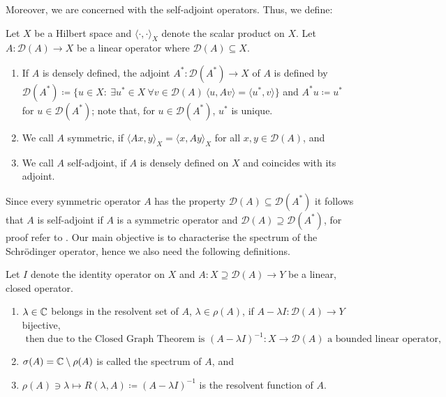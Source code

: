 Moreover, we are concerned with the self-adjoint operators. Thus, we define:

\begin{definition}
Let $X$ be a Hilbert space and $\langle \cdot, \cdot \rangle_{X}$ denote the scalar product on $X$. Let $A \colon \mathcal{D}(A) \rightarrow X$ be a linear operator where $\mathcal{D}(A) \subseteq X$.
	\begin{enumerate}[label=\alph*\upshape)]
		\item If $A$ is densely defined, the adjoint $A^{*} \colon \mathcal{D}(A^{*}) \rightarrow X$ of $A$ is defined by $\mathcal{D}(A^{*}) \coloneqq \{ u \in X \colon ~\exists u^{*} \in X ~\forall v \in \mathcal{D}(A) ~\langle u, Av \rangle = \langle u^{*} , v \rangle \}$ and $A^{*} u \coloneqq u^{*}$ for $u \in \mathcal{D}(A^{*})$; note that, for $u \in \mathcal{D}(A^{*})$, $u^{*}$ is unique.
		\item We call $A$ symmetric, if $\langle Ax,y \rangle_{X} = \langle x , Ay \rangle_{X}$ for all $x,y \in \mathcal{D}(A)$, and
		\item We call $A$ self-adjoint, if $A$ is densely defined on $X$ and coincides with its adjoint.
	\end{enumerate}
\end{definition}

Since every symmetric operator $A$ has the property $\mathcal{D}(A) \subseteq \mathcal{D}(A^{*})$ it follows that $A$ is self-adjoint if $A$ is a symmetric operator and $\mathcal{D}(A) \supseteq \mathcal{D}(A^{*})$, for proof refer to \cite[p. 256]{reed1908methods}. Our main objective is to characterise the spectrum of the Schrödinger operator, hence we also need the following definitions.

\begin{definition}
Let $I$ denote the identity operator on $X$ and $A \colon X \supseteq \mathcal{D}(A) \rightarrow Y$ be a linear, closed operator.
	\begin{enumerate}[label=\alph*\upshape)]
		\item $\lambda \in \mathbb{C}$ belongs in the resolvent set of $A$, $\lambda \in \rho(A)$, if $A  - \lambda I \colon \mathcal{D}(A) \rightarrow Y$ bijective, 
			\[ \text{ then due to the Closed Graph Theorem is } (A - \lambda I)^{-1} \colon X \rightarrow \mathcal{D}(A) \text{ a bounded linear operator,} \]
		\item $\sigma(A) = \mathbb{C} \setminus \rho(A)$ is called the spectrum of $A$, and
		\item $\rho(A) \ni \lambda \mapsto R(\lambda, A) \coloneqq (A - \lambda I)^{-1}$ is the resolvent function of $A$.
	\end{enumerate}		
\end{definition}

